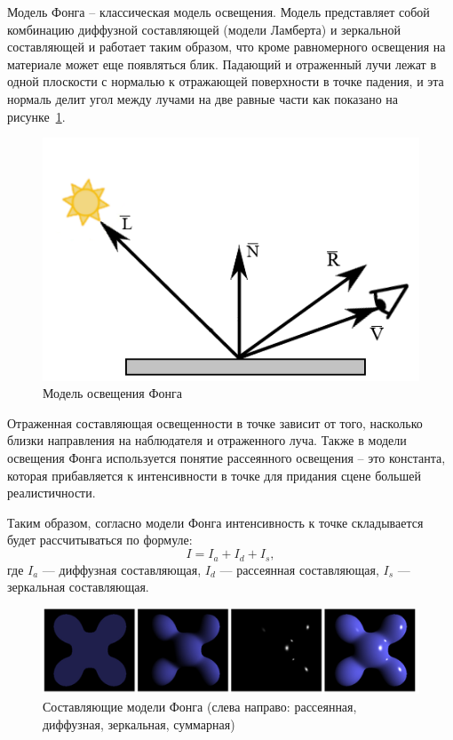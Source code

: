 Модель Фонга – классическая модель освещения. Модель представляет собой комбинацию диффузной составляющей (модели Ламберта) и зеркальной составляющей и работает таким образом, что кроме равномерного освещения на материале может еще появляться блик.
Падающий и отраженный лучи лежат в одной плоскости с нормалью к отражающей поверхности в точке падения, и эта нормаль делит угол между лучами на две равные части как показано на рисунке~\ref{img:fong-light}.

\begin{figure}[h]
	\centering
	\includegraphics[height=0.3\textheight]{img/phong.png}
	\caption{Модель освещения Фонга}
	\label{img:fong-light}
\end{figure}

Отраженная составляющая освещенности в точке зависит от того, насколько близки направления на наблюдателя и отраженного луча.
Также в модели освещения Фонга используется понятие рассеянного освещения – это константа, которая прибавляется к интенсивности в точке для придания сцене большей реалистичности. 
 
Таким образом, согласно модели Фонга интенсивность к точке складывается будет рассчитываться по формуле: 
\begin{equation}
	\label{eq:simple-model}
	I = I_a + I_d + I_s,
\end{equation}
где $I_a$ --- диффузная составляющая, $I_d$ --- рассеянная  составляющая, $I_s$ --- зеркальная составляющая.
 
\begin{figure}[h]
	\centering
	\includegraphics[height=0.15\textheight]{img/phong-model.png}
	\caption{Составляющие модели Фонга (слева направо: рассеянная, диффузная, зеркальная, суммарная)}
	\label{img:fong-model}
\end{figure}

